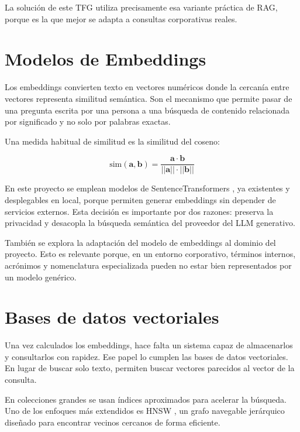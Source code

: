 La solución de este TFG utiliza precisamente esa variante práctica de RAG, porque es la que mejor se adapta a consultas corporativas reales.

\section{Modelos de Embeddings}

Los embeddings convierten texto en vectores numéricos donde la cercanía entre vectores representa similitud semántica. Son el mecanismo que permite pasar de una pregunta escrita por una persona a una búsqueda de contenido relacionada por significado y no solo por palabras exactas.

Una medida habitual de similitud es la similitud del coseno:

\begin{equation}
\text{sim}(\mathbf{a}, \mathbf{b}) = \frac{\mathbf{a} \cdot \mathbf{b}}{||\mathbf{a}|| \cdot ||\mathbf{b}||}
\end{equation}

En este proyecto se emplean modelos de SentenceTransformers \cite{reimers2019sentence,sbertDocs}, ya existentes y desplegables en local, porque permiten generar embeddings sin depender de servicios externos. Esta decisión es importante por dos razones: preserva la privacidad y desacopla la búsqueda semántica del proveedor del LLM generativo.

También se explora la adaptación del modelo de embeddings al dominio del proyecto. Esto es relevante porque, en un entorno corporativo, términos internos, acrónimos y nomenclatura especializada pueden no estar bien representados por un modelo genérico.

\section{Bases de datos vectoriales}

Una vez calculados los embeddings, hace falta un sistema capaz de almacenarlos y consultarlos con rapidez. Ese papel lo cumplen las bases de datos vectoriales. En lugar de buscar solo texto, permiten buscar vectores parecidos al vector de la consulta.

En colecciones grandes se usan índices aproximados para acelerar la búsqueda. Uno de los enfoques más extendidos es HNSW \cite{malkov2016hnsw}, un grafo navegable jerárquico diseñado para encontrar vecinos cercanos de forma eficiente.

